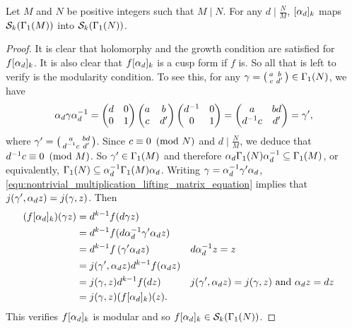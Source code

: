       \begin{proposition}\label{equ:lifting_operator_modular}
        Let $M$ and $N$ be positive integers such that $M \mid N$. For any $d \mid \frac{N}{M}$, $[\alpha_{d}]_{k}$ maps $\mathcal{S}_{k}(\Gamma_{1}(M))$ into $\mathcal{S}_{k}(\Gamma_{1}(N))$.
      \end{proposition}
      \begin{proof}
        It is clear that holomorphy and the growth condition are satisfied for $f[\alpha_{d}]_{k}$. It is also clear that $f[\alpha_{d}]_{k}$ is a cusp form if $f$ is. So all that is left to verify is the modularity condition. To see this, for any $\gamma = \begin{psmallmatrix} a & b \\ c & d' \end{psmallmatrix} \in \Gamma_{1}(N)$, we have
        \begin{equation}\label{equ:nontrivial_multiplication_lifting_matrix_equation}
          \alpha_{d}\gamma\alpha_{d}^{-1} = \begin{pmatrix} d & 0 \\ 0 & 1 \end{pmatrix}\begin{pmatrix} a & b \\ c & d' \end{pmatrix}\begin{pmatrix} d^{-1} & 0 \\ 0 & 1 \end{pmatrix} = \begin{pmatrix} a & bd \\ d^{-1}c & d' \end{pmatrix} = \gamma',
        \end{equation}
        where $\gamma' = \begin{psmallmatrix} a & bd \\ d^{-1}c & d' \end{psmallmatrix}$. Since $c \equiv 0 \ \left(\text{mod }N\right)$ and $d \mid \frac{N}{M}$, we deduce that $d^{-1}c \equiv 0 \ \left(\text{mod }M\right)$. So $\gamma' \in \Gamma_{1}(M)$ and therefore $\alpha_{d}\Gamma_{1}(N)\alpha_{d}^{-1} \subseteq \Gamma_{1}(M)$, or equivalently, $\Gamma_{1}(N) \subseteq \alpha_{d}^{-1}\Gamma_{1}(M)\alpha_{d}$. Writing $\gamma = \alpha_{d}^{-1}\gamma'\alpha_{d}$, \cref{equ:nontrivial_multiplication_lifting_matrix_equation} implies that $j(\gamma',\alpha_{d}z) = j(\gamma,z)$. Then 
        \begin{align*}
          (f[\alpha_{d}]_{k})(\gamma z) &= d^{k-1}f(d \gamma z) \\
          &= d^{k-1}f(d\alpha_{d}^{-1}\gamma'\alpha_{d}z) \\
          &= d^{k-1}f\left(\gamma'\alpha_{d}z\right) && \text{$d\alpha_{d}^{-1}z = z$}\\
          &= j(\gamma',\alpha_{d}z)d^{k-1}f(\alpha_{d}z) \\
          &= j(\gamma,z)d^{k-1}f(dz) && \text{$j(\gamma',\alpha_{d}z) = j(\gamma,z)$ and $\alpha_{d}z = dz$} \\
          &= j(\gamma,z)(f[\alpha_{d}]_{k})(z).
        \end{align*}
        This verifies $f[\alpha_{d}]_{k}$ is modular and so $f[\alpha_{d}]_{k} \in \mathcal{S}_{k}(\Gamma_{1}(N))$.
      \end{proof}

